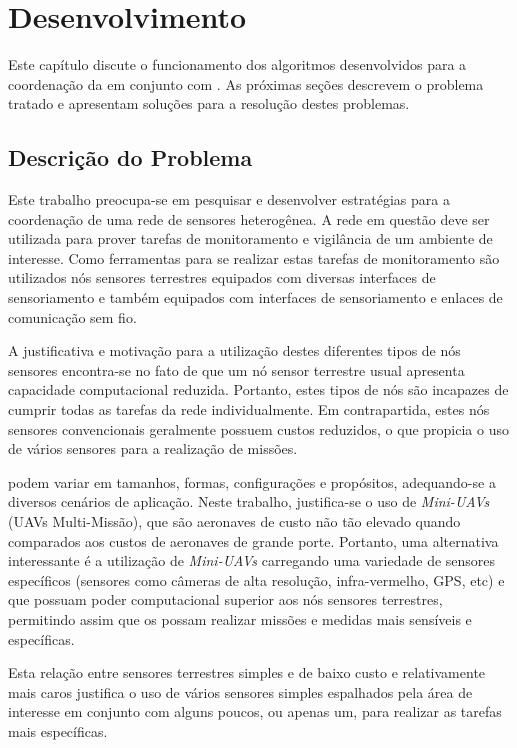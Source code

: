 \newpage\section{Desenvolvimento}

Este capítulo discute o funcionamento dos algoritmos desenvolvidos para a coordenação da \rssf em conjunto com 
\vants. As próximas seções descrevem o problema tratado e apresentam soluções para a resolução destes problemas.


\subsection{Descrição do Problema}

Este trabalho preocupa-se em pesquisar e desenvolver estratégias para a
coordenação de uma rede de sensores heterogênea. A rede em questão deve ser
utilizada para prover tarefas de monitoramento e vigilância de um ambiente de
interesse. Como ferramentas para se realizar estas tarefas de monitoramento são
utilizados nós sensores terrestres equipados com diversas interfaces de
sensoriamento e \vants também equipados com interfaces de sensoriamento e
enlaces de comunicação sem fio.

A justificativa e motivação para a utilização destes diferentes tipos de nós
sensores encontra-se no fato de que um nó sensor terrestre usual apresenta
capacidade computacional reduzida. Portanto, estes tipos de nós são incapazes de
cumprir todas as tarefas da rede individualmente. Em contrapartida, estes nós
sensores convencionais geralmente possuem custos reduzidos, o que propicia o uso
de vários sensores para a realização de missões. 

\uavs podem variar em tamanhos, formas, configurações e propósitos, adequando-se
a diversos cenários de aplicação. Neste trabalho, justifica-se o uso de
\emph{Mini-UAVs} (UAVs Multi-Missão), que são aeronaves de custo não tão elevado
quando comparados aos custos de aeronaves de grande porte. Portanto, uma
alternativa interessante é a utilização de \emph{Mini-UAVs} carregando uma
variedade de sensores específicos (sensores como câmeras de alta resolução,
infra-vermelho, GPS, etc) e que possuam poder computacional superior aos nós
sensores terrestres, permitindo assim que os \vants possam realizar missões e
medidas mais sensíveis e específicas.

Esta relação entre sensores terrestres simples e de baixo custo e \vants
relativamente mais caros justifica o uso de vários sensores simples espalhados
pela área de interesse em conjunto com alguns poucos, ou apenas um, \vant para
realizar as tarefas mais específicas. 


